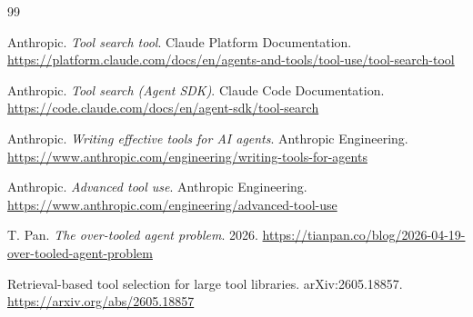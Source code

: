 \documentclass[11pt]{article}
\begin{document}
\begin{thebibliography}{99}

Anthropic. \textit{Tool search tool}. Claude Platform Documentation.
\url{https://platform.claude.com/docs/en/agents-and-tools/tool-use/tool-search-tool}

Anthropic. \textit{Tool search (Agent SDK)}. Claude Code Documentation.
\url{https://code.claude.com/docs/en/agent-sdk/tool-search}

Anthropic. \textit{Writing effective tools for AI agents}. Anthropic Engineering.
\url{https://www.anthropic.com/engineering/writing-tools-for-agents}

Anthropic. \textit{Advanced tool use}. Anthropic Engineering.
\url{https://www.anthropic.com/engineering/advanced-tool-use}

T. Pan. \textit{The over-tooled agent problem}. 2026.
\url{https://tianpan.co/blog/2026-04-19-over-tooled-agent-problem}

Retrieval-based tool selection for large tool libraries. arXiv:2605.18857.
\url{https://arxiv.org/abs/2605.18857}

\end{thebibliography}
\end{document}

